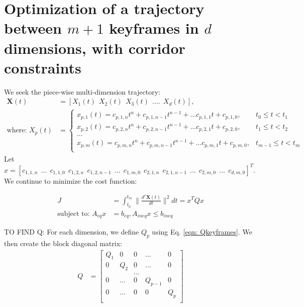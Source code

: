 \documentclass[11pt]{article}
\begin{document}
\newpage
\section{Optimization of a trajectory between $m+1$ keyframes in $d$ dimensions, with corridor constraints} 

\mbox{} \newline
We seek the piece-wise multi-dimension trajectory: 
\begin{align*}
\mathbf{X} (t) &= [X_1(t) \ \ X_2(t) \ \ X_3(t) \ \ .... \ \ X_d(t) ], \\
\text{where: } X_p(t) &= 
\begin{cases}
    x_{p, 1} (t) = c_{p, 1, n} t^n + c_{p, 1, n-1} t^{n-1} + ... c_{p, 1, 1} t + c_{p, 1, 0}, & t_0 \le t < t_1 \\
    x_{p, 2} (t) = c_{p, 2, n} t^n + c_{p, 2, n-1} t^{n-1} + ... c_{p, 2, 1} t + c_{p, 2, 0}, & t_1 \le t < t_2 \\
    ... \\
    x_{p, m} (t) = c_{p, m, n} t^n + c_{p, m, n-1} t^{n-1} + ... c_{p, m, 1} t + c_{p, m, 0}, & t_{m-1} \le t < t_m \\
\end{cases}
\end{align*} 
Let $x = [c_{1, 1, n} \ \ ... \ \ c_{1, 1, 0} \ \ c_{1, 2, n} \ \ c_{1, 2, n-1} \ \ ... \ \ c_{1, m, 0} \ \ c_{2, 1, n} \ \ c_{2, 1, n-1} \ \ ... \ \ c_{2, m, 0} \ \ ... \ \ c_{d, m, 0} ]^T$. We continue to minimize the cost function:

\begin{align*}
J &= \int_{t_0}^{t_m} \|  \frac{d^{r} \mathbf{X} (t) }{dt} \|^2 dt = x^T Q x \\
\text{subject to: } A_{eq} x &=b_{eq}, A_{ineq} x \le b_{ineq}
\end{align*}




\mbox{} \newline
\mbox{} \newline
TO FIND Q: \newline
For each dimension, we define $Q_p$ using Eq. \ref{eqn: Qkeyframes}. We then create the block diagonal matrix:
\begin{align}
\label{eqn: Qdim} Q &= 
\begin{bmatrix}
  Q_1 & 0 & 0 & ... & 0 \\
  0 & Q_2 & 0 & ... & 0 \\
  & & ... & &  \\
  0 & ... & 0 & Q_{p-1} & 0 \\
  0 & ... & 0 & 0 & Q_p \\ 
 \end{bmatrix}
\end{align}
\end{document}
